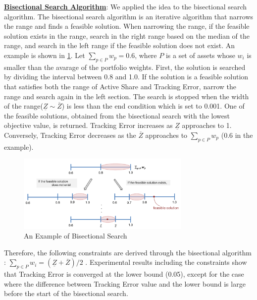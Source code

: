 \documentclass[11pt]{article}
\begin{document}
	
	\underline{\textbf{Bisectional Search Algorithm}}:
	We applied the idea to the bisectional search algorithm. The bisectional search algorithm is an iterative algorithm that narrows the range and finds a feasible solution. When narrowing the range, if the feasible solution exists in the range, search in the right range based on the median of the range, and search in the left range if the feasible solution does not exist.	
	An example is shown in \ref{fig:bisection}. Let  $ \sum_{p\in P} w_p = 0.6$, where $P$ is a set of assets whose $w_i$ is smaller than the avarage of the portfolio weights. First, the solution is searched by dividing the interval between 0.8 and 1.0. If the solution is a feasible solution that satisfies both the range of Active Share and Tracking Error, narrow the range and search again in the left section. The search is stopped when the width of the range($\underline{Z} \sim \overline{Z}$) is less than the end condition which is set to 0.001. One of the feasible solutions, obtained from the bisectional search with the lowest objective value, is returned. Tracking Error increases as $\underline{Z}$ approaches to 1. Conversely, Tracking Error decreases as the $\overline{Z}$ approaches to $\sum_{p\in P}w_p$ (0.6 in the example). 
	\begin{figure}[h] 
		\begin{center}
			\includegraphics[width=0.75\textwidth]{bisection}
			\caption{An Example of Bisectional Search} \label{fig:bisection}
		\end{center}
	\end{figure}
	Therefore, the following constraints are derived through the bisectional algorithm : $\sum_{p \in P} w_i = (\underline{Z} +\overline{Z})/2 $ . Experimental results including the constraints show that Tracking Error is converged at the lower bound (0.05), except for the case where the difference between Tracking Error value and the lower bound is large before the start of the bisectional search.
	
	
	
\end{document}
